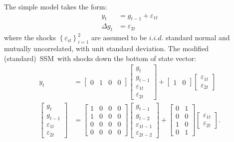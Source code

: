 \documentclass[a4paper,12pt]{article}
\newcommand{\bsq}{\begin{subequations}}\newcommand{\esq}{\end{subequations}}
\begin{document}
The simple model takes the form:\bsq\label{clark0}%
\begin{align}
y_{t}& =g_{t-1}+\varepsilon _{1t} \\
\Delta g_{t}& =\varepsilon _{2t}
\end{align}%
\esq where the shocks $\left\{ \varepsilon _{it}\right\} _{i=1}^{2}$ are
assumed to be $i.i.d.$ standard normal and mutually uncorrelated, with unit
standard deviation. The modified (standard)\ SSM\ with shocks down the
bottom of state vector:%
\begin{align}
y_{t}& =%
\begin{bmatrix}
0 & 1 & 0 & 0%
\end{bmatrix}%
\begin{bmatrix}
g_{t} \\ 
g_{t-1} \\ 
\varepsilon _{1t} \\ 
\varepsilon _{2t}%
\end{bmatrix}%
+%
\begin{bmatrix}
1 & 0%
\end{bmatrix}%
\begin{bmatrix}
\varepsilon _{1t} \\ 
\varepsilon _{2t}%
\end{bmatrix}
\\[4mm]
\begin{bmatrix}
g_{t} \\ 
g_{t-1} \\ 
\varepsilon _{1t} \\ 
\varepsilon _{2t}%
\end{bmatrix}%
& =%
\begin{bmatrix}
1 & 0 & 0 & 0 \\ 
1 & 0 & 0 & 0 \\ 
0 & 0 & 0 & 0 \\ 
0 & 0 & 0 & 0%
\end{bmatrix}%
\begin{bmatrix}
g_{t-1} \\ 
g_{t-2} \\ 
\varepsilon _{1t-1} \\ 
\varepsilon _{2t-2}%
\end{bmatrix}%
+%
\begin{bmatrix}
0 & 1 \\ 
0 & 0 \\ 
1 & 0 \\ 
0 & 1%
\end{bmatrix}%
\begin{bmatrix}
\varepsilon _{1t} \\ 
\varepsilon _{2t}%
\end{bmatrix}%
.
\end{align}
\end{document}
